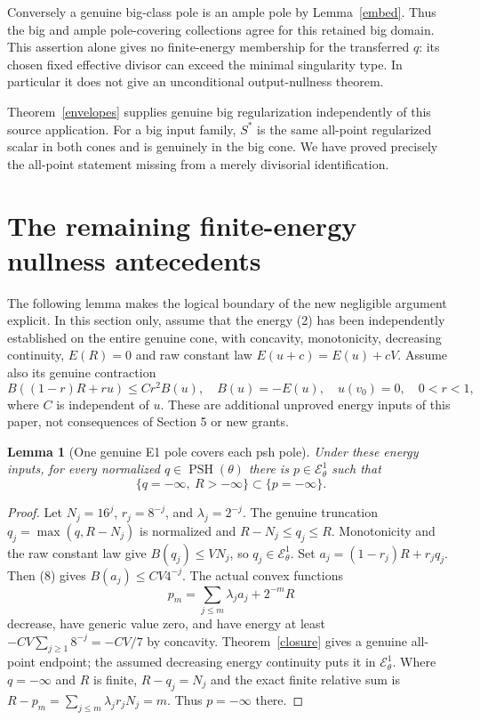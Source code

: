 \documentclass[10pt]{article}
\newtheorem{lemma}[theorem]{Lemma}
\newcommand{\PSH}{\operatorname{PSH}}
\newcommand{\EE}{\mathcal E^1_\theta}
\begin{document}
Conversely a genuine big-class pole is an ample pole by
Lemma~\ref{embed}. Thus the big and ample pole-covering collections
agree for this retained big domain. This assertion alone gives no
finite-energy membership for the transferred $q$: its chosen fixed
effective divisor can exceed the minimal singularity type. In
particular it does not give an unconditional output-nullness theorem.

Theorem~\ref{envelopes} supplies genuine big regularization independently
of this source application. For a big input family, $S^*$ is the same
all-point regularized scalar in both cones and is genuinely in the
big cone. We have proved precisely the all-point statement missing
from a merely divisorial identification.

\section{The remaining finite-energy nullness antecedents}
The following lemma makes the logical boundary of the new negligible
argument explicit. In this section only, assume that the energy (2)
has been independently established on the entire genuine cone, with
concavity, monotonicity, decreasing continuity, $E(R)=0$ and raw
constant law $E(u+c)=E(u)+cV$. Assume also its genuine contraction
\[
 B((1-r)R+ru)\leq C r^2 B(u),\quad B(u)=-E(u),
 \quad u(v_0)=0,\quad0<r<1,                              \tag{8}
\]
where $C$ is independent of $u$. These are additional unproved
energy inputs of this paper, not consequences of Section 5 or new grants.

\begin{lemma}[One genuine E1 pole covers each psh pole]\label{e1pole}
Under these energy inputs, for every normalized
$q\in\PSH(\theta)$ there is $p\in\EE$ such that
\[
 \{q=-\infty,\ R> -\infty\}\subset\{p=-\infty\}.
\]
\end{lemma}
\begin{proof}
Let $N_j=16^j$, $r_j=8^{-j}$, and $\lambda_j=2^{-j}$.
The genuine truncation $q_j=\max(q,R-N_j)$ is normalized and
$R-N_j\leq q_j\leq R$. Monotonicity and the raw constant law
give $B(q_j)\leq VN_j$, so $q_j\in\EE$.
Set $a_j=(1-r_j)R+r_jq_j$. Then (8) gives
$B(a_j)\leq CV4^{-j}$. The actual convex functions
\[
 p_m=\sum_{j\leq m}\lambda_j a_j+2^{-m}R
\]
decrease, have generic value zero, and have energy at least
$-CV\sum_{j\geq1}8^{-j}=-CV/7$ by concavity.
Theorem~\ref{closure} gives a genuine all-point endpoint; the
assumed decreasing energy continuity puts it in $\EE$.
Where $q=-\infty$ and $R$ is finite, $R-q_j=N_j$ and the exact
finite relative sum is
$R-p_m=\sum_{j\leq m}\lambda_jr_jN_j=m$. Thus $p=-\infty$ there.
\end{proof}
\end{document}

